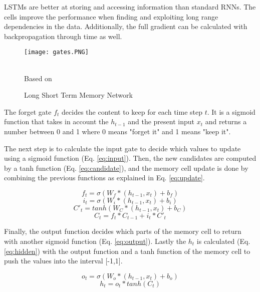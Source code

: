 LSTMs are better at storing and accessing information than standard RNNs. The cells improve the performance when finding and exploiting long range dependencies in the data. Additionally, the full gradient can be calculated with backpropagation through time as well.\cite{graves2013generating}

\begin{figure}
\center
\texttt{[image: gates.PNG]}
\caption{Long Short Term Memory Network}
\label{fig:lstm}
\begin{minipage}{12cm}
    \footnotesize
    \center
    \emph \\ Based on \cite{greff2016lstm}
    \end{minipage}
\end{figure}

The forget gate $f_t$ decides the content to keep for each time step $t$. It is a sigmoid function that takes in account the $h_{t-1}$ and the present input $x_t$ and returns a number between 0 and 1 where 0 means "forget it" and 1 means "keep it". 

The next step is to calculate the input gate to decide which values to update using a sigmoid function (Eq. \ref{eq:input}). Then, the new candidates are computed by a tanh function (Eq. \ref{eq:candidate}), and the memory cell update is done by combining the previous functions as explained in Eq. \ref{eq:update}.

\begin{equation} \label{eq:forget}
f_t=\sigma(W_f*(h_{t-1},x_t)+b_f)
\end{equation}
\begin{equation} \label{eq:input}
i_t=\sigma(W_i*(h_{t-1},x_t)+b_i)
\end{equation}
\begin{equation} \label{eq:candidate}
C'_t=tanh(W_C*(h_{t-1},x_t)+b_C)
\end{equation}
\begin{equation} \label{eq:update}
C_t=f_t*C_{t-1}+i_t*C'_t
\end{equation}

Finally, the output function decides which parts of the memory cell to return with another sigmoid function (Eq. \ref{eq:output}). Lastly the $h_t$ is calculated (Eq. \ref{eq:hidden}) with the output function and a tanh function of the memory cell to push the values into the interval [-1,1].

\begin{equation} \label{eq:output}
o_t=\sigma(W_o*(h_{t-1},x_t)+b_o)
\end{equation}
\begin{equation} \label{eq:hidden}
h_t=o_t*tanh(C_t)
\end{equation}


